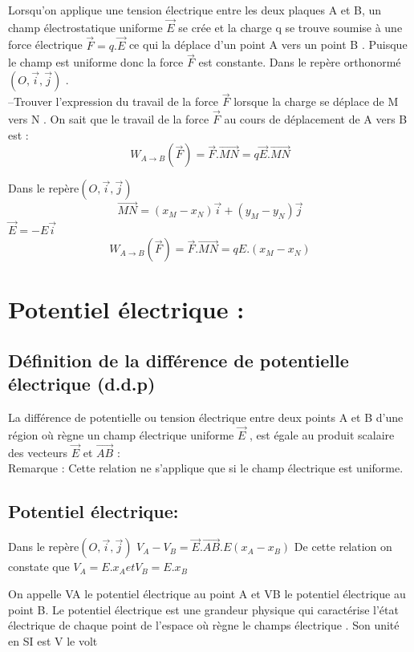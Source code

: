 \documentclass[12pt]{article}
\begin{document}
 Lorsqu’on applique une tension électrique entre les deux plaques A et B, un champ électrostatique 
 uniforme $\vec{E}$ se crée et la charge q se trouve soumise à une force
électrique $\vec{F} = q.\vec{E}$ ce qui la déplace d’un point A vers un point B .
Puisque le champ est uniforme donc la force $\vec{F}$ est constante.
Dans le repère orthonormé $(O, \vec{i}, \vec{j})$ .
\\--Trouver l’expression du travail de la force $\vec{F}$ lorsque la charge se déplace de M vers N .
On sait que le travail de la force $\vec{F}$ au cours de déplacement de A
vers B est : $$W_{A\rightarrow B}(\vec{F}) = \vec{F}.\vec{MN} = q\vec{E}.\vec{MN}$$
\begin{center}
  \color{blue}
  Dans le repère$ (O, \vec{i},\vec{j})$
  $$\overrightarrow{MN} = (x_M - x_N)\vec{i} + (y_M - y_N)\vec{j}$$
  $\vec{E} = -E\vec{i}$
  $$W_{A\rightarrow B}(\vec{F}) = \vec{F}.\vec{MN} = qE.(x_M - x_N) $$

\end{center}

\section{Potentiel électrique  : }
\subsection{Définition de la différence de potentielle électrique (d.d.p)}
La différence de potentielle ou tension électrique entre deux points
A et B d’une région où règne un champ électrique uniforme $\vec{E}$ , est
égale au produit scalaire des vecteurs $\vec{E}$ et  $\vec{AB}$ :
\\Remarque : Cette relation ne s’applique que si le champ
électrique est uniforme.


\subsection{ Potentiel électrique: }

  Dans le repère$ (O, \vec{i},\vec{j})$
  $V_A - V_B = \vec{E}.\overrightarrow{AB}.E(x_A - x_B)$
De cette relation on constate que $V_A = E.x_A et V_B = E.x_B$
\begin{tcolorbox}
On appelle VA le potentiel électrique au point A et VB le
potentiel électrique au point B.
Le potentiel électrique est une grandeur physique qui caractérise
l’état électrique de chaque point de l’espace où règne le champs
électrique . Son unité en SI est V le volt

\end{tcolorbox}
\end{document}
